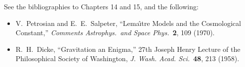

See the bibliographies to Chapters 14 and 15, and the following:

\begin{itemize}
  \item[\(\square\)] V.~Petrosian and E.~E.~Salpeter,
  ``Lema\^{\i}tre Models and the Cosmological Constant,''
  \emph{Comments Astrophys.\ and Space Phys.}\ \textbf{2}, 109 (1970).

  \item[\(\square\)] R.~H.~Dicke, ``Gravitation an Enigma,'' 27th Joseph
  Henry Lecture of the Philosophical Society of Washington,
  \emph{J. Wash. Acad. Sci.}\ \textbf{48}, 213 (1958).
\end{itemize}


